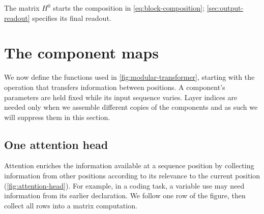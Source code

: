 \documentclass[11pt,twoside]{article}
\theoremstyle{plain}
\theoremstyle{definition}
\theoremstyle{remark}
\begin{document}
The matrix $H^0$ starts the composition in \eqref{eq:block-composition};
\cref{sec:output-readout} specifies its final readout.

\section{The component maps}
\label{sec:component-maps}

We now define the functions used in \cref{fig:modular-transformer}, starting
with the operation that transfers information between positions. A component's
parameters are held fixed while its input sequence varies. Layer indices
are needed only when we assemble different copies of the components and as such
we will suppress them in this section.

\subsection{One attention head}
\label{sec:one-attention-head}

Attention enriches the information available at a sequence position by
collecting information from other positions according to its relevance to
the current position (\cref{fig:attention-head}). For example, in a coding
task, a variable use may need information from its earlier declaration.
We follow one row of the figure, then collect all rows into a matrix
computation.
\end{document}
